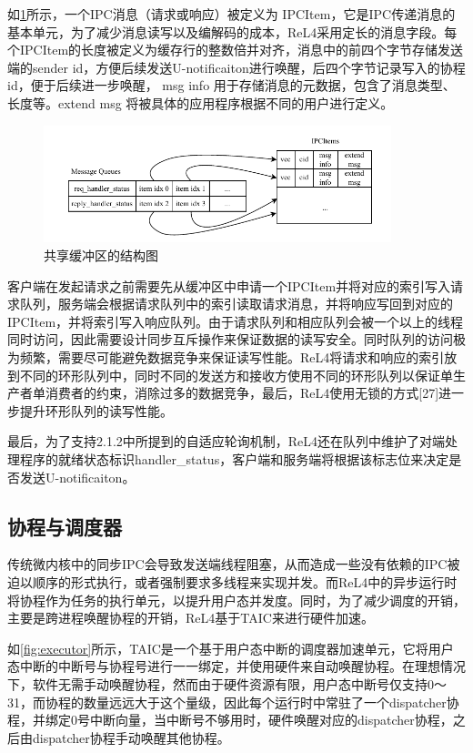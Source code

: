 如\ref{fig:ipcitem}所示，一个IPC消息（请求或响应）被定义为 IPCItem，它是IPC传递消息的基本单元，为了减少消息读写以及编解码的成本，ReL4采用定长的消息字段。每个IPCItem的长度被定义为缓存行的整数倍并对齐，消息中的前四个字节存储发送端的sender id，方便后续发送U-notificaiton进行唤醒，后四个字节记录写入的协程id，便于后续进一步唤醒， msg info 用于存储消息的元数据，包含了消息类型、长度等。extend msg 将被具体的应用程序根据不同的用户进行定义。

\begin{figure}[htbp]
  \centering
  \includegraphics[width=0.9\textwidth]{figures/IPCItem.drawio.pdf}
  \caption{共享缓冲区的结构图}\label{fig:ipcitem}
\end{figure}

客户端在发起请求之前需要先从缓冲区中申请一个IPCItem并将对应的索引写入请求队列，服务端会根据请求队列中的索引读取请求消息，并将响应写回到对应的IPCItem，并将索引写入响应队列。由于请求队列和相应队列会被一个以上的线程同时访问，因此需要设计同步互斥操作来保证数据的读写安全。同时队列的访问极为频繁，需要尽可能避免数据竞争来保证读写性能。ReL4将请求和响应的索引放到不同的环形队列中，同时不同的发送方和接收方使用不同的环形队列以保证单生产者单消费者的约束，消除过多的数据竞争，最后，ReL4使用无锁的方式[27]进一步提升环形队列的读写性能。

最后，为了支持2.1.2中所提到的自适应轮询机制，ReL4还在队列中维护了对端处理程序的就绪状态标识handler\_status，客户端和服务端将根据该标志位来决定是否发送U-notificaiton。

\subsection{协程与调度器}
传统微内核中的同步IPC会导致发送端线程阻塞，从而造成一些没有依赖的IPC被迫以顺序的形式执行，或者强制要求多线程来实现并发。而ReL4中的异步运行时将协程作为任务的执行单元，以提升用户态并发度。同时，为了减少调度的开销，主要是跨进程唤醒协程的开销，ReL4基于TAIC来进行硬件加速。

如\ref{fig:executor}所示，TAIC是一个基于用户态中断的调度器加速单元，它将用户态中断的中断号与协程号进行一一绑定，并使用硬件来自动唤醒协程。在理想情况下，软件无需手动唤醒协程，然而由于硬件资源有限，用户态中断号仅支持0～31，而协程的数量远远大于这个量级，因此每个运行时中常驻了一个dispatcher协程，并绑定0号中断向量，当中断号不够用时，硬件唤醒对应的dispatcher协程，之后由dispatcher协程手动唤醒其他协程。

